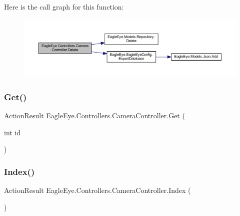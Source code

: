 Here is the call graph for this function\+:\nopagebreak
\begin{figure}[H]
\begin{center}
\leavevmode
\includegraphics[width=350pt]{class_eagle_eye_1_1_controllers_1_1_camera_controller_ade4d5c697769c79b1866f95bbf7fc889_cgraph}
\end{center}
\end{figure}
\mbox{\label{class_eagle_eye_1_1_controllers_1_1_camera_controller_a6dfc692f61939468dffcf13b5899ed5f}} 
\subsubsection{\texorpdfstring{Get()}{Get()}}
{\footnotesize\ttfamily Action\+Result Eagle\+Eye.\+Controllers.\+Camera\+Controller.\+Get (\begin{DoxyParamCaption}\item[{int}]{id }\end{DoxyParamCaption})}





\mbox{\label{class_eagle_eye_1_1_controllers_1_1_camera_controller_aef90502fd5923368a7ef1773280e4b32}} 
\subsubsection{\texorpdfstring{Index()}{Index()}}
{\footnotesize\ttfamily Action\+Result Eagle\+Eye.\+Controllers.\+Camera\+Controller.\+Index (\begin{DoxyParamCaption}{ }\end{DoxyParamCaption})}





